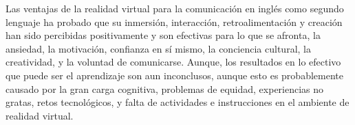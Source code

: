 Las ventajas de la realidad virtual para la comunicación en ingl\'es como segundo lenguaje ha probado que su inmersión, interacción, retroalimentación y creación han sido percibidas positivamente y son efectivas para lo que se afronta, la ansiedad, la motivación, confianza en s\'i mismo, la conciencia cultural, la creatividad, y la voluntad de comunicarse. Aunque, los resultados en lo efectivo que puede ser el aprendizaje son aun inconclusos, aunque esto es probablemente causado por la gran carga cognitiva, problemas de equidad, experiencias no gratas, retos tecnológicos, y falta de actividades e instrucciones en el ambiente de realidad virtual. \parencite{YUDINTSEVA2023100018}
